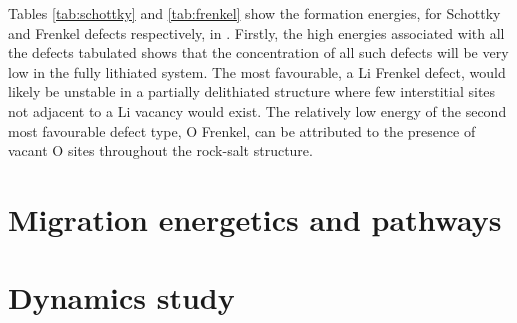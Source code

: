 Tables \ref{tab:schottky} and \ref{tab:frenkel} show the formation energies, for Schottky and Frenkel defects respectively, in .
Firstly, the high energies associated with all the defects tabulated shows that the concentration of all such defects will be very low in the fully lithiated system.
The most favourable, a Li Frenkel defect, would likely be unstable in a partially delithiated structure where few interstitial sites not adjacent to a Li vacancy would exist.
The relatively low energy of the second most favourable defect type, O Frenkel, can be attributed to the presence of vacant O sites throughout the rock-salt structure.

\newpage


\section{Migration energetics and pathways}
\begin{table}[h]
\centering
\caption{Li vacancy migration energies in }
\label{tab:migrationMn}
\end{table}




\newpage
\section{Dynamics study}
\newpage